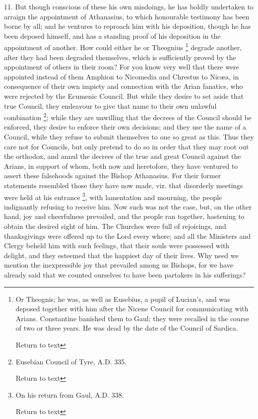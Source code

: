 11. But though conscious of these his own
misdoings, he has boldly undertaken to arraign the appointment of
Athanasius, to which honourable testimony has been borne by all; and
he ventures to reproach him with his deposition, though he has been
deposed himself, and has a standing proof of his deposition in the
appointment of another. How could either he or Theognius \footnote{Or Theognis; he was, as well as Eusebius, a pupil of Lucian's, and was
deposed together with him after the Nicene Council for communicating
with Arians. Constantine banished them to Gaul; they were recalled in
the course of two or three years. He was dead by the date of the
Council of Sardica.

Return to text} degrade another, after they had been degraded themselves, which
is sufficiently proved by the appointment of others in their room? For
you know very well that there were appointed instead of them
Amphion to Nicomedia and Chrestus to Nicæa, in consequence of their
own impiety and connection with the Arian fanatics, who were rejected
by the Ecumenic Council. But while they desire to set aside that true
Council, they endeavour to give that name to their own unlawful
combination \footnote{Eusebian Council of Tyre, A.D. 335.

Return to text}; while they
are unwilling that the decrees of the Council should be enforced, they
desire to enforce their own decisions; and they use the name of a
Council, while they refuse to submit themselves to one so great as
this. Thus they care not for Councils, but only pretend to do so in
order that they may root out the orthodox, and annul the decrees of
the true and great Council against the Arians, in support of whom,
both now and heretofore, they have ventured to assert these falsehoods
against the Bishop Athanasius. For their former statements resembled
those they have now made, viz. that disorderly meetings were held at
his entrance \footnote{On his return from Gaul, A.D. 338.

Return to text}, with
lamentation and mourning, the people indignantly refusing to receive
him. Now such was not the case, but, on the other hand, joy and
cheerfulness prevailed, and the people ran together, hastening to
obtain the desired sight of him. The Churches were full of rejoicings,
and thanksgivings were offered up to the Lord every where; and all the
Ministers and Clergy beheld him with such feelings, that their souls
were possessed with delight, and they esteemed that the happiest day
of their lives. Why need we mention the inexpressible joy that
prevailed among us Bishops, for we have already said that we counted
ourselves to have been partakers in his sufferings?

